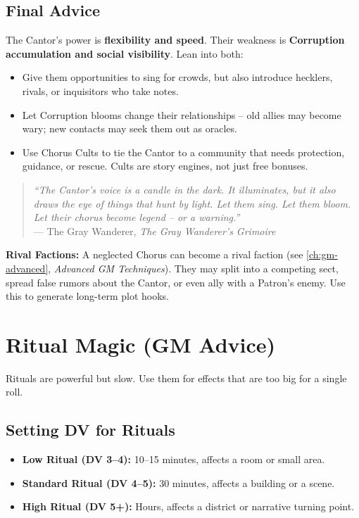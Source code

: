 \subsection*{Final Advice}
\label{subsec:cantor-final-gm}
The Cantor's power is \textbf{flexibility and speed}. Their weakness is \textbf{Corruption accumulation and social visibility}. Lean into both:
\begin{itemize}
  \item Give them opportunities to sing for crowds, but also introduce hecklers, rivals, or inquisitors who take notes.
  \item Let Corruption blooms change their relationships -- old allies may become wary; new contacts may seek them out as oracles.
  \item Use Chorus Cults to tie the Cantor to a community that needs protection, guidance, or rescue. Cults are story engines, not just free bonuses.
\end{itemize}

\begin{quote}
\emph{``The Cantor's voice is a candle in the dark. It illuminates, but it also draws the eye of things that hunt by light. Let them sing. Let them bloom. Let their chorus become legend -- or a warning.''} \\
--- The Gray Wanderer, \textit{The Gray Wanderer's Grimoire}
\end{quote}

\textbf{Rival Factions:} A neglected Chorus can become a rival faction (see \ref{ch:gm-advanced}, \textit{Advanced GM Techniques}). They may split into a competing sect, spread false rumors about the Cantor, or even ally with a Patron's enemy. Use this to generate long-term plot hooks.

\section{Ritual Magic (GM Advice)}
\label{sec:rituals-gm}

Rituals are powerful but slow. Use them for effects that are too big for a single roll.

\subsection*{Setting DV for Rituals}
\begin{itemize}
  \item \textbf{Low Ritual (DV 3--4):} 10--15 minutes, affects a room or small area.
  \item \textbf{Standard Ritual (DV 4--5):} 30 minutes, affects a building or a scene.
  \item \textbf{High Ritual (DV 5+):} Hours, affects a district or narrative turning point.
\end{itemize}

